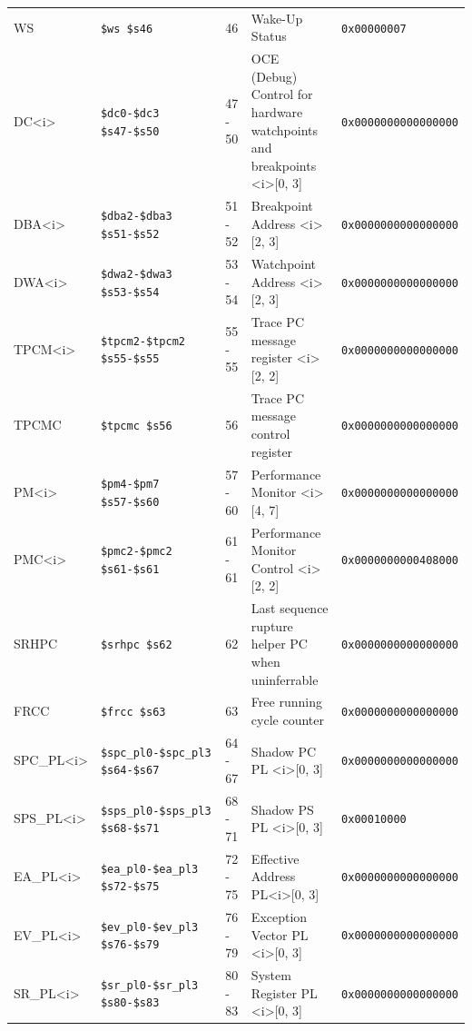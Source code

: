 {\begin{tabular}{|l|l|l|l|l|}
WS & \verb|$ws $s46| & 46 & Wake-Up Status & \verb|0x00000007| \\
DC\textless i\textgreater & \verb|$dc0-$dc3 $s47-$s50| & 47 - 50 & OCE (Debug) Control for hardware watchpoints and breakpoints \textless i\textgreater [0, 3] & \verb|0x0000000000000000| \\
DBA\textless i\textgreater & \verb|$dba2-$dba3 $s51-$s52| & 51 - 52 & Breakpoint Address \textless i\textgreater [2, 3] & \verb|0x0000000000000000| \\
DWA\textless i\textgreater & \verb|$dwa2-$dwa3 $s53-$s54| & 53 - 54 & Watchpoint Address \textless i\textgreater [2, 3] & \verb|0x0000000000000000| \\
TPCM\textless i\textgreater & \verb|$tpcm2-$tpcm2 $s55-$s55| & 55 - 55 & Trace PC message register \textless i\textgreater [2, 2] & \verb|0x0000000000000000| \\
TPCMC & \verb|$tpcmc $s56| & 56 & Trace PC message control register & \verb|0x0000000000000000| \\
PM\textless i\textgreater & \verb|$pm4-$pm7 $s57-$s60| & 57 - 60 & Performance Monitor \textless i\textgreater [4, 7] & \verb|0x0000000000000000| \\
PMC\textless i\textgreater & \verb|$pmc2-$pmc2 $s61-$s61| & 61 - 61 & Performance Monitor Control \textless i\textgreater [2, 2] & \verb|0x0000000000408000| \\
SRHPC & \verb|$srhpc $s62| & 62 & Last sequence rupture helper PC when uninferrable & \verb|0x0000000000000000| \\
FRCC & \verb|$frcc $s63| & 63 & Free running cycle counter & \verb|0x0000000000000000| \\
SPC\_PL\textless i\textgreater & \verb|$spc_pl0-$spc_pl3 $s64-$s67| & 64 - 67 & Shadow PC PL \textless i\textgreater [0, 3] & \verb|0x0000000000000000| \\
SPS\_PL\textless i\textgreater & \verb|$sps_pl0-$sps_pl3 $s68-$s71| & 68 - 71 & Shadow PS PL \textless i\textgreater [0, 3] & \verb|0x00010000| \\
EA\_PL\textless i\textgreater & \verb|$ea_pl0-$ea_pl3 $s72-$s75| & 72 - 75 & Effective Address PL\textless i\textgreater [0, 3] & \verb|0x0000000000000000| \\
EV\_PL\textless i\textgreater & \verb|$ev_pl0-$ev_pl3 $s76-$s79| & 76 - 79 & Exception Vector PL \textless i\textgreater [0, 3] & \verb|0x0000000000000000| \\
SR\_PL\textless i\textgreater & \verb|$sr_pl0-$sr_pl3 $s80-$s83| & 80 - 83 & System Register PL \textless i\textgreater [0, 3] & \verb|0x0000000000000000| \\

\end{tabular}}
